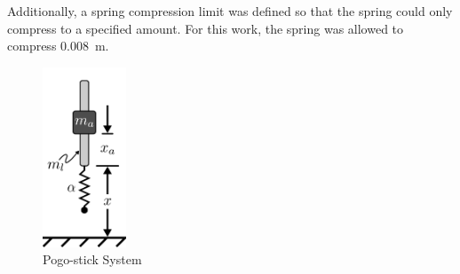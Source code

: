 \documentclass[letterpaper, 10 pt, conference]{ieeeconf}  %
\begin{document}
Additionally, a spring compression limit was defined so that the spring could only compress to a specified amount. For this work, the spring was allowed to compress 0.008~m.
%
\begin{figure}[t]
        \begin{center}
        \includegraphics[width=2.5cm]{figures/pogo_system_a.pdf}
        \caption{Pogo-stick System}
        \label{fig:pogoStickSystem} 
        \end{center}
        \end{figure}
\end{document}
